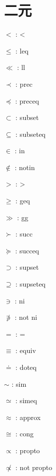 \documentclass[UTF8]{ctexart}
\begin{document}
\newpage

\section{二元}

\begin{multicols}{3}
$<$ : < \par
$\leq$ : leq \par
$\ll$ : ll \par
$\prec$ : prec \par
$\preceq$ : preceq \par
$\subset$ : subset \par
$\subseteq$ : subseteq \par
$\in$ : in\par
$\notin$ : notin \par

$>$ : > \par
$\geq$ : geq\par
$\gg$ : gg \par 
$\succ$ : succ \par
$\succeq$ : succeq \par
$\supset$ : supset \par
$\supseteq$ : supseteq \par
$\ni$ : ni\par
$\not\ni$ : not ni\par

$=$ : =\par
$\equiv$ : equiv\par
$\doteq$ : doteq \par
$\sim$ : sim \par
$\simeq$ : simeq \par
$\approx$ : approx \par
$\cong$ : cong \par
$\propto$ : propto \par
$\not\propto$ : not propto

\end{multicols}

\ \\
\end{document}
